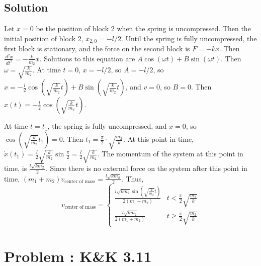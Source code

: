 \documentclass[solutions]{esg8012pset}
\renewcommand{\d}{\,d}
\begin{document}
\subsection{Solution}
  Let $x = 0$ be the position of block 2 when the spring is uncompressed.  Then the initial position of block 2, $x_{2,0} = -l/2$.  Until the spring is fully uncompressed, the first block is stationary, and the force on the second block is $F = -kx$.  Then $\frac{\d^2 x}{\d t^2} = -\frac{k}{m_2}x$.  Solutions to this equation are $A\cos(\omega t) + B\sin(\omega t)$.  Then $\omega = \sqrt{\frac{k}{m_2}}$.  At time $t = 0$, $x = -l/2$, so $A = -l/2$, so $x = -\frac{l}{2}\cos\left(\sqrt{\frac{k}{m_2}} t\right) + B\sin\left(\sqrt{\frac{k}{m_2}}t\right)$, and $v = 0$, so $B = 0$.  Then $x(t) = -\frac{l}{2}\cos\left(\sqrt{\frac{k}{m_2}} t\right)$.

  At time $t = t_1$, the spring is fully uncompressed, and $x = 0$, so $\cos\left(\sqrt{\frac{k}{m_2}} t_1 \right) = 0$.  Then $t_1 = \frac{\pi}{2}\cdot \sqrt{\frac{m_2}{k}}$.  At this point in time, $\dot x(t_1) = \frac{l}{2}\sqrt{\frac{k}{m_2}}\sin\frac{\pi}{2} = \frac{l}{2}\sqrt{\frac{k}{m_2}}$.  The momentum of the system at this point in time, is $\frac{l\sqrt{k m_2}}{2}$.  Since there is no external force on the system after this point in time, $(m_1 + m_2)v_{\text{center of mass}} = \frac{l\sqrt{k m_2}}{2}$.  Thus, $$v_{\text{center of mass}} = \begin{cases} \frac{l\sqrt{k m_2}\sin\left(\sqrt{\frac{k}{m_2}} t\right)}{2(m_1 + m_2)} & t < \frac{\pi}{2}\sqrt{\frac{m_2}{k}} \\ \frac{l\sqrt{k m_2}}{2(m_1 + m_2)} & t \geq \frac{\pi}{2}\sqrt{\frac{m_2}{k}} \end{cases}$$
\section{Problem \thesection: K\&K 3.11}
\end{document}
